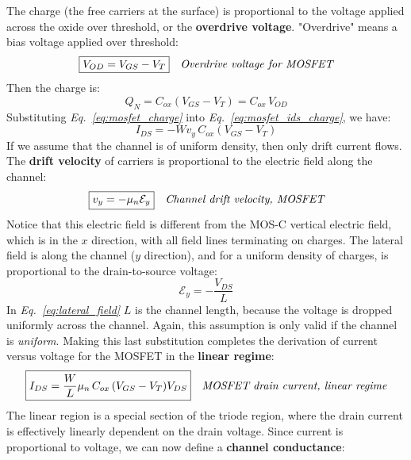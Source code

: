 The charge (the free carriers at the surface) is proportional to the voltage applied across the oxide over threshold, or the \textbf{overdrive voltage}.  "Overdrive" means a bias voltage applied over threshold:
    \begin{align}
        \Aboxed{V_{OD} &= V_{GS} - V_T}
        &\textit{Overdrive voltage for MOSFET}
    \end{align}
Then the charge is:
    \begin{equation}
        Q_N = C_{ox}(V_{GS} - V_T)
        = C_{ox}\,V_{OD}
        \label{eq:mosfet_charge}
    \end{equation}
Substituting \emph{Eq.~\ref{eq:mosfet_charge}} into \emph{Eq.~\ref{eq:mosfet_ids_charge}}, we have:
    \begin{equation}
        I_{DS} = -W v_y\,C_{ox}(V_{GS} - V_{T})
        \label{eq:mosfet_ids_charge_od}
    \end{equation}
If we assume that the channel is of uniform density, then only drift current flows.  The \textbf{drift velocity} of carriers is proportional to the electric field along the channel:
    \begin{align}
        \Aboxed{v_y &= -\mu_n\mathcal{E}_y} &\textit{Channel drift velocity, MOSFET}
    \end{align}
Notice that this electric field is different from the MOS-C vertical electric field, which is in the $x$ direction, with all field lines terminating on charges.  The lateral field is along the channel ($y$ direction), and for a uniform density of charges, is proportional to the drain-to-source voltage:
    \begin{equation}
        \mathcal{E}_y = -\frac{V_{DS}}{L}
        \label{eq:lateral_field}
    \end{equation}\textbf{}
In \emph{Eq.~\ref{eq:lateral_field}} $L$ is the channel length, because the voltage is dropped uniformly across the channel.  Again, this assumption is only valid if the channel is \textit{uniform}.  Making this last substitution completes the derivation of current versus voltage for the MOSFET in the \textbf{linear regime}:
    \begin{align}
        \Aboxed{I_{DS} &= \frac{W}{L}\mu_n\,C_{ox}\,(V_{GS} - V_T)V_{DS}}
        &\textit{MOSFET drain current, linear regime}
    \end{align}
The linear region is a special section of the triode region, where the drain current is effectively linearly dependent on the drain voltage. Since current is proportional to voltage, we can now define a \textbf{channel conductance}:
